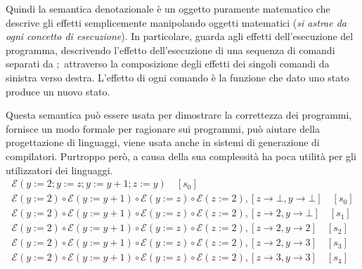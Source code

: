 \documentclass[oneside,a4paper,11pt]{book}
\theoremstyle{italicstyle}
\theoremstyle{normStyle}
\begin{document}
Quindi la semantica denotazionale è un oggetto puramente matematico che descrive
gli effetti semplicemente manipolando oggetti matematici (\textit{si astrae da ogni
concetto di esecuzione}). In particolare, guarda agli effetti dell’esecuzione
del programma, descrivendo l’effetto dell’esecuzione di una sequenza di comandi
separati da $;$ attraverso la composizione degli effetti dei singoli comandi da
sinistra verso destra. L’effetto di ogni comando è la funzione che dato uno stato
produce un nuovo stato. 

Questa semantica può essere usata per dimostrare la correttezza dei programmi,
fornisce un modo formale per ragionare sui programmi, può aiutare della
progettazione di linguaggi, viene usata anche in sistemi di generazione
di compilatori. Purtroppo però, a causa della sua complessità ha poca
utilità per gli utilizzatori dei linguaggi.
\begin{multline*}
  \mathcal{E}(y:=2;y:=z;y:=y+1;z:=y)\quad [s_0] \\
  \mathcal{E}(y:=2)\circ  \mathcal{E}(y := y + 1)\circ  \mathcal{E}(y := z)\circ  \mathcal{E}(z:=2),[z \rightarrow \bot , y \rightarrow \bot]\quad [s_0] \\
  \mathcal{E}(y:=2)\circ  \mathcal{E}(y := y + 1)\circ  \mathcal{E}(y := z)\circ  \mathcal{E}(z:=2),[z \rightarrow 2 , y \rightarrow \bot]\quad [s_1] \\
  \mathcal{E}(y:=2)\circ  \mathcal{E}(y := y + 1)\circ  \mathcal{E}(y := z)\circ  \mathcal{E}(z:=2),[z \rightarrow 2 , y \rightarrow 2]\quad [s_2] \\
  \mathcal{E}(y:=2)\circ  \mathcal{E}(y := y + 1)\circ  \mathcal{E}(y := z)\circ  \mathcal{E}(z:=2),[z \rightarrow 2 , y \rightarrow 3]\quad [s_3] \\
  \mathcal{E}(y:=2)\circ  \mathcal{E}(y := y + 1)\circ  \mathcal{E}(y := z)\circ  \mathcal{E}(z:=2),[z \rightarrow 3 , y \rightarrow 3]\quad [s_4]
\end{multline*}
\end{document}
